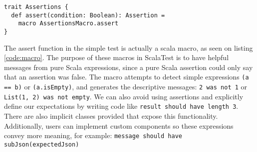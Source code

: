 \begin{lstlisting}[caption=Macros, label=code:macros, float]
trait Assertions {
  def assert(condition: Boolean): Assertion =
    macro AssertionsMacro.assert
}
\end{lstlisting}

The assert function in the simple test is actually a scala macro, as seen on listing \ref{code:macro}. The purpose of these macros in ScalaTest is to have helpful messages from pure Scala expressions, since a pure Scala assertion could only say that an assertion was false. The macro attempts to detect simple expressions \texttt{(a == b)} or \texttt{(a.isEmpty)}, and generates the descriptive messages: \texttt{2 was not 1} or \texttt{List(1, 2) was not empty}. We can also avoid using assertions and explicitly define our expectations by writing code like \texttt{result should have length 3}. There are also implicit classes provided that expose this functionality. Additionally, users can implement custom components so these expressions convey more meaning, for example: \texttt{message should have subJson(expectedJson)}
